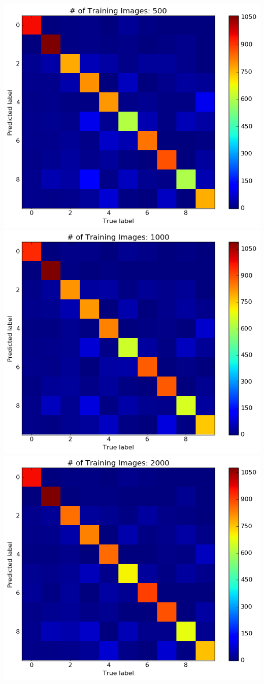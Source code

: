 \documentclass{article}
\begin{document}
\begin{center}
  \includegraphics[scale=0.4]{500}
  \includegraphics[scale=0.4]{1000}\\
  \includegraphics[scale=0.4]{2000}

\end{center}
\end{document}
